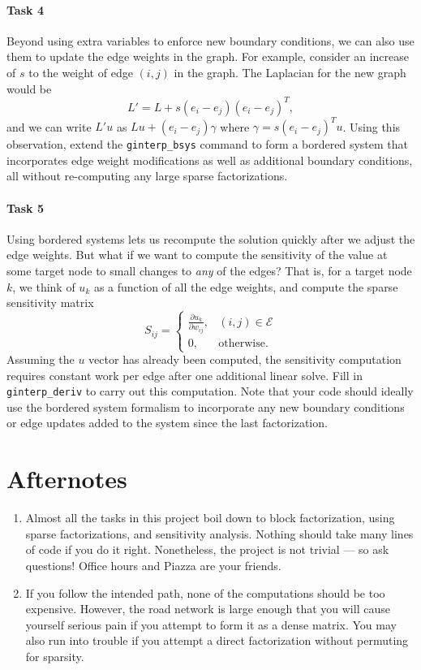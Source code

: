 \documentclass[12pt, leqno]{article}
\begin{document}
\paragraph*{Task 4}
Beyond using extra variables to enforce new boundary conditions, we
can also use them to update the edge weights in the graph.  For
example, consider an increase of $s$ to the weight of edge $(i,j)$
in the graph.  The Laplacian for the new graph would be
\[
  L' = L + s (e_i-e_j) (e_i-e_j)^T,
\]
and we can write $L'u$ as $Lu + (e_i-e_j) \gamma$ where
$\gamma = s (e_i-e_j)^T u$.  Using this observation, extend the
{\tt ginterp\_bsys} command to form a bordered system that incorporates
edge weight modifications as well as additional boundary conditions,
all without re-computing any large sparse factorizations.

\paragraph*{Task 5}
Using bordered systems lets us recompute the solution quickly after we
adjust the edge weights.  But what if we want to compute the sensitivity
of the value at some target node to small changes to {\em any} of the
edges?  That is, for a target node $k$, we think of $u_k$ as a function
of all the edge weights, and compute the sparse sensitivity matrix
\[
  S_{ij} =
  \begin{cases}
    \frac{\partial u_k}{\partial w_{ij}}, & (i,j) \in \mathcal{E} \\
    0, & \mbox{otherwise}.
  \end{cases}
\]
Assuming the $u$ vector has already been computed, the sensitivity
computation requires constant work per edge after one additional
linear solve.  Fill in {\tt ginterp\_deriv} to carry out this
computation.  Note that your code should ideally use the bordered
system formalism to incorporate any new boundary conditions or
edge updates added to the system since the last factorization.

\section*{Afternotes}

\begin{enumerate}
\item Almost all the tasks in this project boil down to block factorization,
  using sparse factorizations, and sensitivity analysis.  Nothing should take
  many lines of code if you do it right.  Nonetheless, the project is
  not trivial --- so ask questions!  Office hours and Piazza are your friends.
\item If you follow the intended path, none of the computations should
  be too expensive.  However, the road network is large enough that
  you will cause yourself serious pain if you attempt to form it as a
  dense matrix.  You may also run into trouble if you attempt a direct
  factorization without permuting for sparsity.
\end{enumerate}
\end{document}
